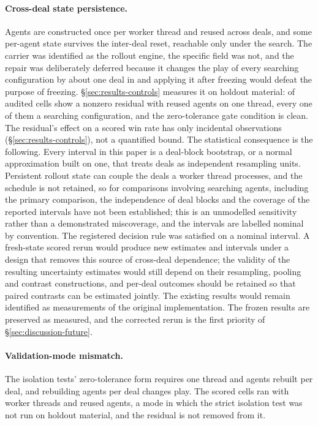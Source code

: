 \paragraph{Cross-deal state persistence.} Agents are constructed once per worker
thread and reused across deals, and some per-agent state survives the inter-deal reset, reachable only
under the search. The carrier was identified as the rollout engine, the specific field was not, and
the repair was deliberately deferred because it changes the play of every searching configuration by
about one deal in \vsevenSsixIncidence{} and applying it after freezing would defeat the purpose of
freezing. \S\ref{sec:results-controls} measures it on holdout material:
\vsevenSsixPlainNonzero{} of \vsevenSsixCells{} audited cells show a nonzero residual with reused
agents on one thread, every one of them a searching configuration, and the zero-tolerance gate
condition is clean. The residual's effect on a scored win rate has only incidental observations
(\S\ref{sec:results-controls}), not a quantified bound. The statistical consequence is the
following. Every interval in this paper is a deal-block bootstrap, or a normal approximation built
on one, that treats deals as independent resampling units. Persistent rollout state can couple the
deals a worker thread processes, and the schedule is not retained, so for comparisons involving
searching agents, including the primary comparison, the independence of deal blocks and the
coverage of the reported intervals have not been established; this is an unmodelled sensitivity
rather than a demonstrated miscoverage, and the intervals are labelled nominal by convention. The
registered decision rule was satisfied on a nominal interval. A fresh-state scored rerun would
produce new estimates and intervals under a design that removes this source of cross-deal
dependence; the validity of the resulting uncertainty estimates would still depend on their
resampling, pooling and contrast constructions, and per-deal outcomes should be retained so that
paired contrasts can be estimated jointly. The existing results would remain identified as
measurements of the original implementation. The frozen results are preserved as measured, and
the corrected rerun is the first priority of \S\ref{sec:discussion-future}.

\paragraph{Validation-mode mismatch.} The isolation tests' zero-tolerance form requires one thread
and agents rebuilt per deal, and rebuilding agents per deal changes play. The scored cells ran with
\vsevenScoredThreads{} worker threads and reused agents, a mode in which the strict isolation test
was not run on holdout material, and the residual is not removed from it.

